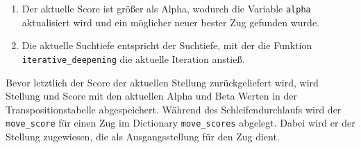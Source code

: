 \begin{enumerate}
\def\labelenumi{\arabic{enumi}.}
\tightlist
\item
  Der aktuelle Score ist größer als Alpha, wodurch die Variable
  \texttt{alpha} aktualisiert wird und ein möglicher neuer bester Zug
  gefunden wurde.
\item
  Die aktuelle Suchtiefe entspricht der Suchtiefe, mit der die Funktion
  \texttt{iterative\_deepening} die aktuelle Iteration anstieß.
\end{enumerate}

Bevor letztlich der Score der aktuellen Stellung zurückgeliefert wird,
wird Stellung und Score mit den aktuellen Alpha und Beta Werten in der
Transpositionstabelle abgespeichert. Während des Schleifendurchlaufs
wird der \texttt{move\_score} für einen Zug im Dictionary
\texttt{move\_scores} abgelegt. Dabei wird er der Stellung zugewiesen,
die als Ausgangsstellung für den Zug dient.

\bigskip

